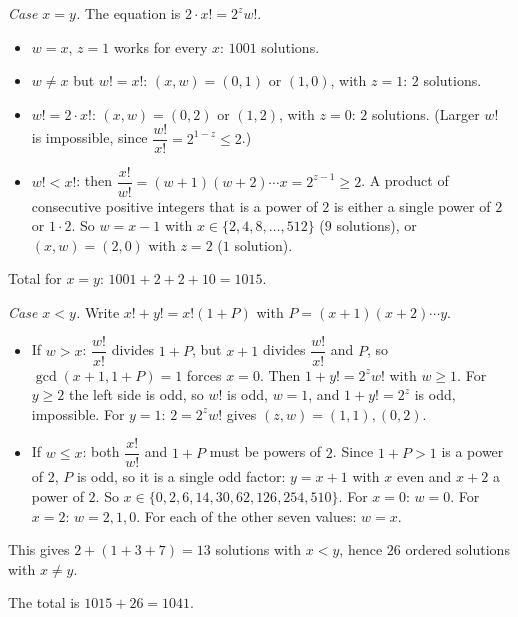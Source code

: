 \emph{Case $x=y$.} The equation is $2\cdot x!=2^z w!$.
\begin{itemize}
\item $w=x$, $z=1$ works for every $x$: $1001$ solutions.
\item $w\ne x$ but $w!=x!$: $(x,w)=(0,1)$ or $(1,0)$, with $z=1$: $2$ solutions.
\item $w!=2\cdot x!$: $(x,w)=(0,2)$ or $(1,2)$, with $z=0$: $2$ solutions. (Larger $w!$ is impossible, since $\dfrac{w!}{x!}=2^{1-z}\le2$.)
\item $w!<x!$: then $\dfrac{x!}{w!}=(w+1)(w+2)\cdots x=2^{z-1}\ge2$. A product of consecutive positive integers that is a power of $2$ is either a single power of $2$ or $1\cdot2$. So $w=x-1$ with $x\in\{2,4,8,\dots,512\}$ ($9$ solutions), or $(x,w)=(2,0)$ with $z=2$ ($1$ solution).
\end{itemize}
Total for $x=y$: $1001+2+2+10=1015$.

\emph{Case $x<y$.} Write $x!+y!=x!(1+P)$ with $P=(x+1)(x+2)\cdots y$.
\begin{itemize}
\item If $w>x$: $\dfrac{w!}{x!}$ divides $1+P$, but $x+1$ divides $\dfrac{w!}{x!}$ and $P$, so $\gcd(x+1,1+P)=1$ forces $x=0$. Then $1+y!=2^zw!$ with $w\ge1$. For $y\ge2$ the left side is odd, so $w!$ is odd, $w=1$, and $1+y!=2^z$ is odd, impossible. For $y=1$: $2=2^zw!$ gives $(z,w)=(1,1),(0,2)$.
\item If $w\le x$: both $\dfrac{x!}{w!}$ and $1+P$ must be powers of $2$. Since $1+P>1$ is a power of $2$, $P$ is odd, so it is a single odd factor: $y=x+1$ with $x$ even and $x+2$ a power of $2$. So $x\in\{0,2,6,14,30,62,126,254,510\}$. For $x=0$: $w=0$. For $x=2$: $w=2,1,0$. For each of the other seven values: $w=x$.
\end{itemize}
This gives $2+(1+3+7)=13$ solutions with $x<y$, hence $26$ ordered solutions with $x\ne y$.

The total is $1015+26=\boxed{1041}$.
